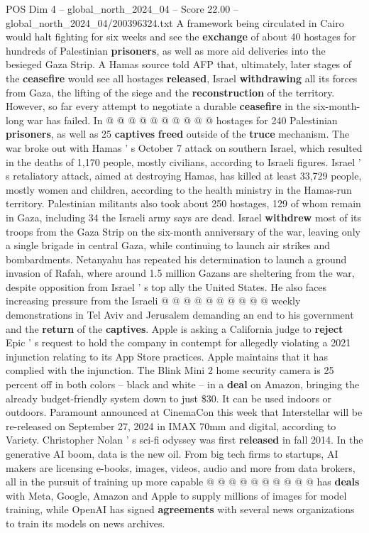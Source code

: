 \begin{textsample}{POS Dim 4 – global\_north\_2024\_04 – Score 22.00 – global\_north\_2024\_04/200396324.txt}
A framework being circulated in Cairo would halt fighting for six weeks and see the \textbf{exchange} of about 40 hostages for hundreds of Palestinian \textbf{prisoners}, as well as more aid deliveries into the besieged Gaza Strip.
A Hamas source told AFP that, ultimately, later stages of the \textbf{ceasefire} would see all hostages \textbf{released}, Israel \textbf{withdrawing} all its forces from Gaza, the lifting of the siege and the \textbf{reconstruction} of the territory.
However, so far every attempt to negotiate a durable \textbf{ceasefire} in the six-month-long war has failed.
In @ @ @ @ @ @ @ @ @ @ hostages for 240 Palestinian \textbf{prisoners}, as well as 25 \textbf{captives} \textbf{freed} outside of the \textbf{truce} mechanism.
The war broke out with Hamas ' s October 7 attack on southern Israel, which resulted in the deaths of 1,170 people, mostly civilians, according to Israeli figures.
Israel ' s retaliatory attack, aimed at destroying Hamas, has killed at least 33,729 people, mostly women and children, according to the health ministry in the Hamas-run territory.
Palestinian militants also took about 250 hostages, 129 of whom remain in Gaza, including 34 the Israeli army says are dead.
Israel \textbf{withdrew} most of its troops from the Gaza Strip on the six-month anniversary of the war, leaving only a single brigade in central Gaza, while continuing to launch air strikes and bombardments.
Netanyahu has repeated his determination to launch a ground invasion of Rafah, where around 1.5 million Gazans are sheltering from the war, despite opposition from Israel ' s top ally the United States.
He also faces increasing pressure from the Israeli @ @ @ @ @ @ @ @ @ @ weekly demonstrations in Tel Aviv and Jerusalem demanding an end to his government and the \textbf{return} of the \textbf{captives}.
Apple is asking a California judge to \textbf{reject} Epic ' s request to hold the company in contempt for allegedly violating a 2021 injunction relating to its App Store practices.
Apple maintains that it has complied with the injunction.
The Blink Mini 2 home security camera is 25 percent off in both colors -- black and white -- in a \textbf{deal} on Amazon, bringing the already budget-friendly system down to just \$30.
It can be used indoors or outdoors.
Paramount announced at CinemaCon this week that Interstellar will be re-released on September 27, 2024 in IMAX 70mm and digital, according to Variety.
Christopher Nolan ' s sci-fi odyssey was first \textbf{released} in fall 2014.
In the generative AI boom, data is the new oil.
From big tech firms to startups, AI makers are licensing e-books, images, videos, audio and more from data brokers, all in the pursuit of training up more capable @ @ @ @ @ @ @ @ @ @ has \textbf{deals} with Meta, Google, Amazon and Apple to supply millions of images for model training, while OpenAI has signed \textbf{agreements} with several news organizations to train its models on news archives.

\end{textsample}
